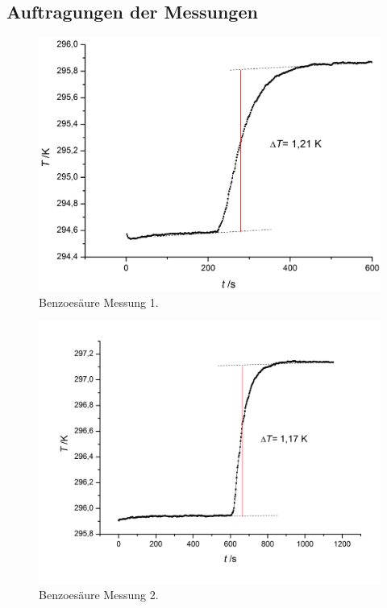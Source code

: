 \documentclass[12pt,a4paper,titlepage,headinclude,bibtotoc]{scrartcl}
\begin{document}
\subsection{Auftragungen der Messungen}
\begin{figure} [h!]
\begin{center}
\includegraphics[scale=0.45]{Benz1.png} \end{center}
\caption{Benzoesäure Messung 1.}
\end{figure}

\begin{figure} [h!]
\begin{center}
\includegraphics[scale=0.45]{Benz2.png} \end{center}
\caption{Benzoesäure Messung 2.}
\end{figure}
\end{document}
